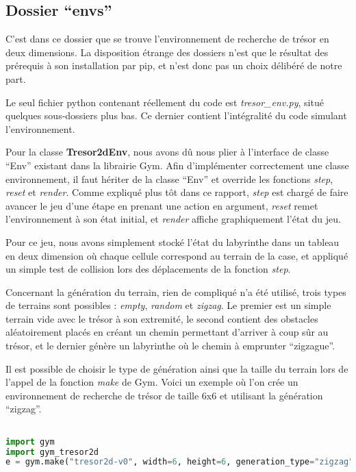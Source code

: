 \subsection{Dossier ``envs''}
C'est dans ce dossier que se trouve l'environnement de recherche de trésor en deux dimensions. La disposition étrange des dossiers n'est que le résultat des prérequis à son installation par pip, et n'est donc pas un choix délibéré de notre part.
\par
Le seul fichier python contenant réellement du code est \textit{tresor\_env.py}, situé quelques sous-dossiers plus bas. Ce dernier contient l'intégralité du code simulant l'environnement.
\par
Pour la classe \textbf{Tresor2dEnv}, nous avons dû nous plier à l'interface de classe ``Env'' existant dans la librairie Gym. Afin d'implémenter correctement une classe environnement, il faut hériter de la classe ``Env'' et override les fonctions \textit{step}, \textit{reset} et \textit{render}. Comme expliqué plus tôt dans ce rapport, \textit{step} est chargé de faire avancer le jeu d'une étape en prenant une action en argument, \textit{reset} remet l'environnement à son état initial, et \textit{render} affiche graphiquement l'état du jeu.
\par
Pour ce jeu, nous avons simplement stocké l'état du labyrinthe dans un tableau en deux dimension où chaque cellule correspond au terrain de la case, et appliqué un simple test de collision lors des déplacements de la fonction \textit{step}.
\par
Concernant la génération du terrain, rien de compliqué n'a été utilisé, trois types de terrains sont possibles : \textit{empty}, \textit{random} et \textit{zigzag}. Le premier est un simple terrain vide avec le trésor à son extremité, le second contient des obstacles aléatoirement placés en créant un chemin permettant d'arriver à coup sûr au trésor, et le dernier génère un labyrinthe où le chemin à emprunter ``zigzague''.
\par
Il est possible de choisir le type de génération ainsi que la taille du terrain lors de l'appel de la fonction \textit{make} de Gym. Voici un exemple où l'on crée un environnement de recherche de trésor de taille 6x6 et utilisant la génération ``zigzag''.

\begin{lstlisting}[language=Python,breaklines=true, caption=Initialisation d'un environnement tresor-2d]

import gym
import gym_tresor2d
e = gym.make("tresor2d-v0", width=6, height=6, generation_type="zigzag")

\end{lstlisting}


